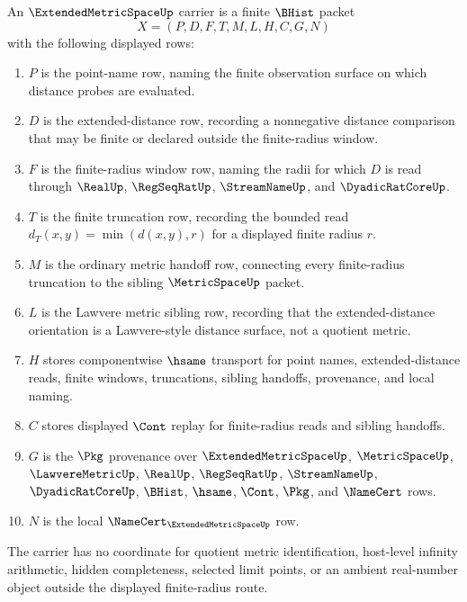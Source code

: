 \begin{definition}
\label{def:extended-metric-space-carrier}
An $\ExtendedMetricSpaceUp$ carrier is a finite $\BHist$ packet
$$
X=(P,D,F,T,M,L,H,C,G,N)
$$
with the following displayed rows:
\begin{enumerate}
\item $P$ is the point-name row, naming the finite observation surface on which distance probes are evaluated.
\item $D$ is the extended-distance row, recording a nonnegative distance comparison that may be finite or declared outside the finite-radius window.
\item $F$ is the finite-radius window row, naming the radii for which $D$ is read through $\RealUp$, $\RegSeqRatUp$, $\StreamNameUp$, and $\DyadicRatCoreUp$.
\item $T$ is the finite truncation row, recording the bounded read $d_T(x,y)=\min(d(x,y),r)$ for a displayed finite radius $r$.
\item $M$ is the ordinary metric handoff row, connecting every finite-radius truncation to the sibling $\MetricSpaceUp$ packet.
\item $L$ is the Lawvere metric sibling row, recording that the extended-distance orientation is a Lawvere-style distance surface, not a quotient metric.
\item $H$ stores componentwise $\hsame$ transport for point names, extended-distance reads, finite windows, truncations, sibling handoffs, provenance, and local naming.
\item $C$ stores displayed $\Cont$ replay for finite-radius reads and sibling handoffs.
\item $G$ is the $\Pkg$ provenance over $\ExtendedMetricSpaceUp$, $\MetricSpaceUp$, $\LawvereMetricUp$, $\RealUp$, $\RegSeqRatUp$, $\StreamNameUp$, $\DyadicRatCoreUp$, $\BHist$, $\hsame$, $\Cont$, $\Pkg$, and $\NameCert$ rows.
\item $N$ is the local $\NameCert_{\ExtendedMetricSpaceUp}$ row.
\end{enumerate}
The carrier has no coordinate for quotient metric identification, host-level infinity arithmetic, hidden completeness, selected limit points, or an ambient real-number object outside the displayed finite-radius route.
\end{definition}

